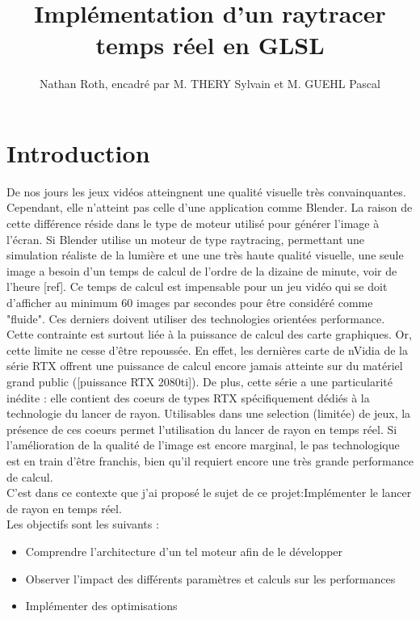 \documentclass{article}
\begin{document}
    

\title{Implémentation d'un {raytracer} temps réel en GLSL}
\author{Nathan Roth, encadré par M. THERY Sylvain et M. GUEHL Pascal}
\maketitle

\section{Introduction}

De nos jours les jeux vidéos atteingnent une qualité visuelle très convainquantes. Cependant, elle n'atteint pas celle d'une application comme Blender. La raison de cette différence réside dans le type de moteur utilisé pour générer l'image à l'écran. Si Blender utilise un moteur de type raytracing, permettant une simulation réaliste de la lumière et une une très haute qualité visuelle, une seule image a besoin d'un temps de calcul de l'ordre de la dizaine de minute, voir de l'heure [ref]. Ce temps de calcul est impensable pour un jeu vidéo qui se doit d'afficher au minimum 60 images par secondes pour être considéré comme "fluide". Ces derniers doivent utiliser des technologies orientées performance.\\
Cette contrainte est surtout liée à la puissance de calcul des carte graphiques. Or, cette limite ne cesse d'être repoussée. En effet, les dernières carte de nVidia de la série RTX offrent une puissance de calcul encore jamais atteinte sur du matériel grand public ([puissance RTX 2080ti]). De plus, cette série a une particularité inédite : elle contient des coeurs de types RTX spécifiquement dédiés à la technologie du lancer de rayon. Utilisables dans une selection (limitée) de jeux, la présence de ces coeurs permet l'utilisation du lancer de rayon en temps réel. Si l'amélioration de la qualité de l'image est encore marginal, le pas technologique est en train d'être franchis, bien qu'il requiert encore une très grande performance de calcul.\\
C'est dans ce contexte que j'ai proposé le sujet de ce projet:Implémenter le lancer de rayon en temps réel.\\
Les objectifs sont les suivants :
\begin{itemize}
    \item Comprendre l'architecture d'un tel moteur afin de le développer
    \item Observer l'impact des différents paramètres et calculs sur les performances
    \item Implémenter des optimisations   
\end{itemize}
\end{document}
